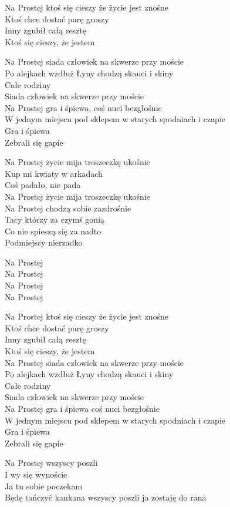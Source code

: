 \begin{text}
    Na Prostej ktoś się cieszy że życie jest znośne\\
    Ktoś chce dostać parę groszy\\
    Inny zgubił całą resztę\\
    Ktoś się cieszy, że jestem

    Na Prostej siada człowiek na skwerze przy moście\\
    Po alejkach wzdłuż Łyny chodzą skauci i skiny\\
    Całe rodziny\\
    Siada człowiek na skwerze przy moście\\
    Na Prostej gra i śpiewa, coś nuci bezgłośnie\\
    W jednym miejscu pod sklepem w starych spodniach i czapie\\
    Gra i śpiewa\\
    Zebrali się gapie

    Na Prostej życie mija troszeczkę ukośnie\\
    Kup mi kwiaty w arkadach\\
    Coś padało, nie pada\\
    Na Prostej życie mija troszeczkę ukośnie\\
    Na Prostej chodzą sobie zazdrośnie\\
    Tacy którzy za czymś gonią\\
    Co nie spieszą się za nadto\\
    Podmiejscy nierzadko

    Na Prostej\\
    Na Prostej\\
    Na Prostej\\
    Na Prostej

    Na Prostej ktoś się cieszy że życie jest znośne\\
    Ktoś chce dostać parę groszy\\
    Inny zgubił całą resztę\\
    Ktoś się cieszy, że jestem\\
    Na Prostej siada człowiek na skwerze przy moście\\
    Po alejkach wzdłuż Łyny chodzą skauci i skiny\\
    Całe rodziny\\
    Siada człowiek na skwerze przy moście\\
    Na Prostej gra i śpiewa coś nuci bezgłośnie\\
    W jednym miejscu pod sklepem w starych spodniach i czapie\\
    Gra i śpiewa\\
    Zebrali się gapie

    Na Prostej wszyscy poszli\\
    I wy się wynoście\\
    Ja tu sobie poczekam\\
    Będę tańczyć kankana wszyscy poszli ja zostaję do rana
\end{text}
\begin{chord}

\end{chord}